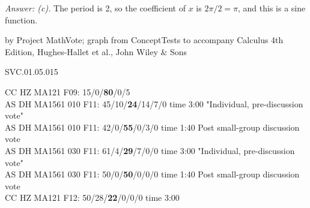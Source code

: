 
{\it Answer: (c).} The period is 2, so the coefficient of $x$ is $2\pi/2 = \pi$, and this is a sine function.

\medskip
by Project MathVote; graph from ConceptTests to accompany Calculus 4th Edition, Hughes-Hallet et al., John Wiley \& Sons

SVC.01.05.015

CC HZ MA121 F09: 15/0/{\bf80}/0/5  \\
AS DH MA1561 010 F11: 45/10/{\bf24}/14/7/0 time 3:00 "Individual, pre-discussion vote" \\
AS DH MA1561 010 F11: 42/0/{\bf55}/0/3/0 time 1:40 Post small-group discussion vote \\
AS DH MA1561 030 F11: 61/4/{\bf29}/7/0/0 time 3:00 "Individual, pre-discussion vote" \\
AS DH MA1561 030 F11: 50/0/{\bf50}/0/0/0 time 1:40 Post small-group discussion vote \\
CC HZ MA121 F12: 50/28/{\bf22}/0/0/0 time 3:00  \\
